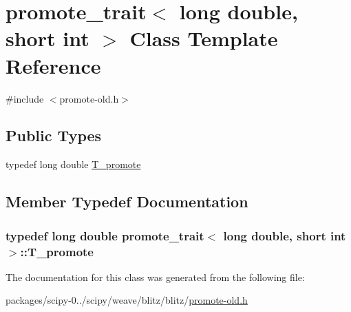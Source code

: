 \hypertarget{classpromote__trait_3_01long_01double_00_01short_01int_01_4}{}\section{promote\+\_\+trait$<$ long double, short int $>$ Class Template Reference}
\label{classpromote__trait_3_01long_01double_00_01short_01int_01_4}


{\ttfamily \#include $<$promote-\/old.\+h$>$}

\subsection*{Public Types}
\begin{DoxyCompactItemize}
\item 
typedef long double \hyperlink{classpromote__trait_3_01long_01double_00_01short_01int_01_4_a70092017cfd4eda2e0e0bd5daf650035}{T\+\_\+promote}
\end{DoxyCompactItemize}


\subsection{Member Typedef Documentation}
\hypertarget{classpromote__trait_3_01long_01double_00_01short_01int_01_4_a70092017cfd4eda2e0e0bd5daf650035}{}
\subsubsection[{T\+\_\+promote}]{\setlength{\rightskip}{0pt plus 5cm}typedef long double {\bf promote\+\_\+trait}$<$ long double, short int $>$\+::{\bf T\+\_\+promote}}\label{classpromote__trait_3_01long_01double_00_01short_01int_01_4_a70092017cfd4eda2e0e0bd5daf650035}


The documentation for this class was generated from the following file\+:\begin{DoxyCompactItemize}
\item 
packages/scipy-\/0../scipy/weave/blitz/blitz/\hyperlink{promote-old_8h}{promote-\/old.\+h}\end{DoxyCompactItemize}
